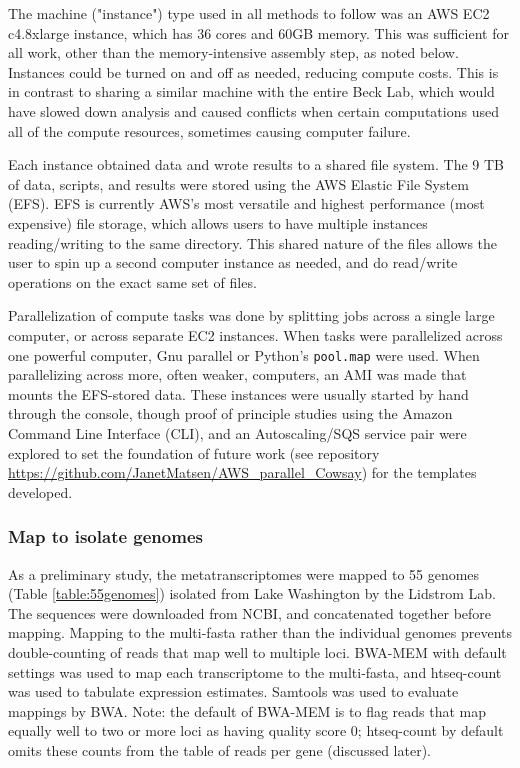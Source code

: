 The machine ("instance") type used in all methods to follow was an AWS EC2 c4.8xlarge instance, which has 36 cores and 60GB memory.
This was sufficient for all work, other than the memory-intensive assembly step, as noted below.
Instances could be turned on and off as needed, reducing compute costs.
This is in contrast to sharing a similar machine with the entire Beck Lab, which would have slowed down analysis and caused conflicts when certain computations used all of the compute resources, sometimes causing computer failure.

Each instance obtained data and wrote results to a shared file system.
The 9 TB of data, scripts, and results were stored using the AWS Elastic File System (EFS).
EFS is currently AWS's most versatile and highest performance (most expensive) file storage, which allows users to have multiple instances reading/writing to the same directory.
This shared nature of the files allows the user to spin up a second computer instance as needed, and do read/write operations on the exact same set of files.

Parallelization of compute tasks was done by splitting jobs across a single large computer, or across separate EC2 instances.
When tasks were parallelized across one powerful computer, Gnu parallel or Python's \texttt{pool.map} were used.
When parallelizing across more, often weaker, computers, an AMI was made that mounts the EFS-stored data.
These instances were usually started by hand through the console, though proof of principle studies using the Amazon Command Line Interface (CLI),
    and an Autoscaling/SQS service pair were explored to set the foundation of future work (see repository \url{https://github.com/JanetMatsen/AWS_parallel_Cowsay}) for the templates developed.

\subsubsection{Map to isolate genomes}
As a preliminary study, the metatranscriptomes were mapped to 55 genomes (Table \ref{table:55genomes}) isolated from Lake Washington by the Lidstrom Lab.
The sequences were downloaded from NCBI, and concatenated together before mapping.
Mapping to the multi-fasta rather than the individual genomes prevents double-counting of reads that map well to multiple loci.
BWA-MEM \cite{li2009} with default settings was used to map each transcriptome to the multi-fasta, and htseq-count \cite{anders2014} was used to tabulate expression estimates.
Samtools \cite{li2009samtools} was used to evaluate mappings by BWA.
Note: the default of BWA-MEM is to flag reads that map equally well to two or more loci as having quality score 0; htseq-count by default omits these counts from the table of reads per gene (discussed later).

